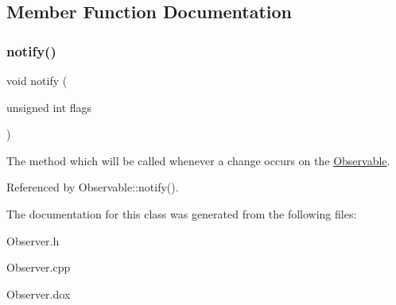 \subsection{Member Function Documentation}
\mbox{\label{classKatabatic_1_1BaseObserver_a52e577fb0c4f2e3650928334fb621c2f}} 
\subsubsection{\texorpdfstring{notify()}{notify()}}
{\footnotesize\ttfamily void notify (\begin{DoxyParamCaption}\item[{unsigned int}]{flags }\end{DoxyParamCaption})\hspace{0.3cm}{\ttfamily [virtual]}}

The method which will be called whenever a change occurs on the \hyperlink{classKatabatic_1_1Observable}{Observable}. 

Referenced by Observable\+::notify().



The documentation for this class was generated from the following files\+:\begin{DoxyCompactItemize}
\item 
Observer.\+h\item 
Observer.\+cpp\item 
Observer.\+dox\end{DoxyCompactItemize}
